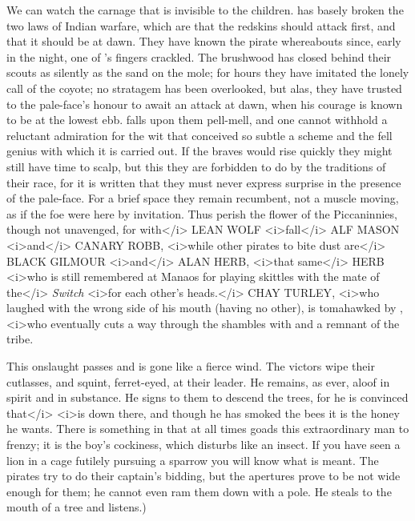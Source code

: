 \begin{drama}
\begin{stagedir}
We can watch the carnage that is invisible to the children.
\hook has basely broken the two laws of Indian warfare,
which are that the redskins should attack first, and that it should be at dawn.
They have known the pirate whereabouts since, early in the night, one of \smee's fingers crackled.
The brushwood has closed behind their scouts as silently as the sand on the mole;
for hours they have imitated the lonely call of the coyote;
no stratagem has been overlooked, but alas, they have trusted to the pale-face's honour to await an attack at dawn,
when his courage is known to be at the lowest ebb.
\hook falls upon them pell-mell,
and one cannot withhold a reluctant admiration for the wit that conceived so subtle a scheme
and the fell genius with which it is carried out.
If the braves would rise quickly they might still have time to scalp,
but this they are forbidden to do by the traditions of their race,
for it is written that they must never express surprise in the presence of the pale-face.
For a brief space they remain recumbent, not a muscle moving, as if the foe were here by invitation.
Thus perish the flower of the Piccaninnies, though not unavenged,
for with</i> {\namefont LEAN WOLF} <i>fall</i> {\namefont ALF MASON} <i>and</i> {\namefont CANARY ROBB},
<i>while other pirates to bite dust are</i> {\namefont BLACK GILMOUR} <i>and</i> {\namefont ALAN HERB},
<i>that same</i> {\namefont HERB} <i>who is still remembered at Manaos
for playing skittles with the mate of the</i> \emph{Switch} <i>for each other's heads.</i>
{\namefont CHAY TURLEY}, <i>who laughed with the wrong side of his mouth (having no other),
is tomahawked by \panther,
<i>who eventually cuts a way through the shambles with \tigerlily and a remnant of the tribe.

This onslaught passes and is gone like a fierce wind.
The victors wipe their cutlasses, and squint, ferret-eyed, at their leader.
He remains, as ever, aloof in spirit and in substance.
He signs to them to descend the trees, for he is convinced that</i> \pan <i>is down there,
and though he has smoked the bees it is the honey he wants.
There is something in \peter that at all times goads this extraordinary man to frenzy;
it is the boy's cockiness, which disturbs \hook like an insect.
If you have seen a lion in a cage futilely pursuing a sparrow you will know what is meant.
The pirates try to do their captain's bidding, but the apertures prove to be not wide enough for them;
he cannot even ram them down with a pole.
He steals to the mouth of a tree and listens.)
\end{stagedir}


\end{drama}
